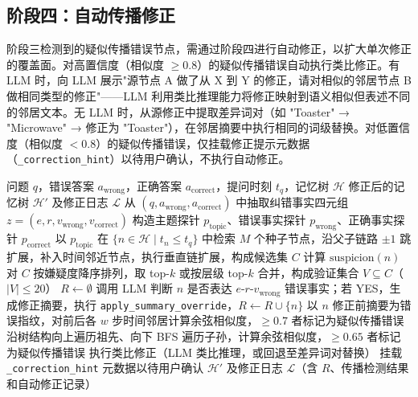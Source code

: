 \subsection{阶段四：自动传播修正}

阶段三检测到的疑似传播错误节点，需通过阶段四进行自动修正，以扩大单次修正的覆盖面。对高置信度（相似度 $\ge 0.8$）的疑似传播错误自动执行类比修正。有 LLM 时，向 LLM 展示"源节点 A 做了从 X 到 Y 的修正，请对相似的邻居节点 B 做相同类型的修正"——LLM 利用类比推理能力将修正映射到语义相似但表述不同的邻居文本。无 LLM 时，从源修正中提取差异词对（如 "Toaster" → "Microwave" → 修正为 "Toaster"），在邻居摘要中执行相同的词级替换。对低置信度（相似度 $< 0.8$）的疑似传播错误，仅挂载修正提示元数据（\texttt{\_correction\_hint}）以待用户确认，不执行自动修正。

\begin{algorithm}[htbp]
\caption{反馈驱动记忆修正管线}
\label{alg:5-1}
\begin{algorithmic}[1]
\Require 问题 $q$，错误答案 $a_{\mathrm{wrong}}$，正确答案 $a_{\mathrm{correct}}$，提问时刻 $t_q$，记忆树 $\mathcal{H}$
\Ensure 修正后的记忆树 $\mathcal{H}'$ 及修正日志 $\mathcal{L}$
\State 从 $(q, a_{\mathrm{wrong}}, a_{\mathrm{correct}})$ 中抽取纠错事实四元组 $z = (e, r, v_{\mathrm{wrong}}, v_{\mathrm{correct}})$ 
\State 构造主题探针 $p_{\mathrm{topic}}$、错误事实探针 $p_{\mathrm{wrong}}$、正确事实探针 $p_{\mathrm{correct}}$ 
\State 以 $p_{\mathrm{topic}}$ 在 $\{n \in \mathcal{H} \mid t_n \le t_q\}$ 中检索 $M$ 个种子节点，沿父子链路 $\pm 1$ 跳扩展，补入时间邻近节点，执行垂直链扩展，构成候选集 $C$
    \State 计算 $\mathrm{suspicion}(n)$ 
\EndFor
\State 对 $C$ 按嫌疑度降序排列，取 top-$k$ 或按层级 top-$k$ 合并，构成验证集合 $V \subseteq C$（$|V| \le 20$）
\State $R \gets \emptyset$
    \State 调用 LLM 判断 $n$ 是否表达 $e$-$r$-$v_{\mathrm{wrong}}$ 错误事实；若 YES，生成修正摘要，执行 \texttt{apply\_summary\_override}，$R \gets R \cup \{n\}$
\EndFor
{}
    \State 以 $n$ 修正前摘要为错误指纹，对前后各 $w$ 步时间邻居计算余弦相似度，$\ge 0.7$ 者标记为疑似传播错误 
    \State 沿树结构向上遍历祖先、向下 BFS 遍历子孙，计算余弦相似度，$\ge 0.65$ 者标记为疑似传播错误 
\EndFor
{}
        \State 执行类比修正（LLM 类比推理，或回退至差异词对替换）
    \Else
        \State 挂载 \texttt{\_correction\_hint} 元数据以待用户确认
    \EndIf
\EndFor
\State \Return $\mathcal{H}'$ 及修正日志 $\mathcal{L}$（含 $R$、传播检测结果和自动修正记录）
\end{algorithmic}
\end{algorithm}

